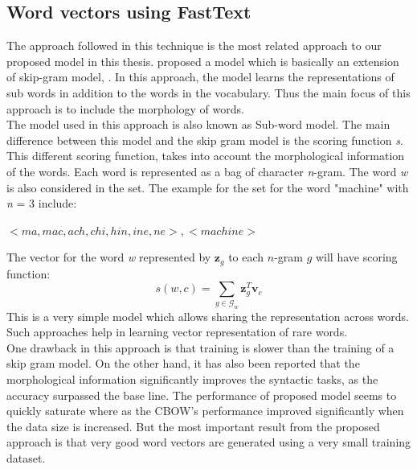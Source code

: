 \subsection{Word vectors using FastText}
The approach followed in this technique is the most related approach to our proposed model in this thesis. \cite{bojanowski2016enriching} proposed a model which is basically an extension of skip-gram model, \cite{mikolov2013efficient}. In this approach, the model learns the representations of sub words in addition to the words in the vocabulary. Thus the main focus of this approach is to include the morphology of words.\\
The model used in this approach is also known as Sub-word model. The main difference between this model and the skip gram model is the scoring function \textit{s}. This different scoring function, takes into account the morphological information of the words.
Each word is represented as a bag of character \textit{n}-gram. The word \textit{w} is also considered in the set. The example for the set for the word "machine" with \textit{n} = 3 include:
\begin{center}
	$\mathit{<ma, mac, ach, chi, hin, ine, ne>, <machine>}$
\end{center}
The vector for the word \textit{w} represented by $\mathbf{z_{\mathit{g}}}$ to each $\mathit{n}$-gram $\mathit{g}$ will have scoring function:
\begin{equation}
\mathit{s(w,c)} = \sum_{g\in \mathcal{G}_{\mathit{w}}} \mathbf{z}^T_{\mathit{g}}\mathbf{v}_{\mathit{c}}
\end{equation}
This is a very simple model which allows sharing the representation across words. Such approaches help in learning vector representation of rare words.\\
One drawback in this approach is that training is slower than the training of a skip gram model. On the other hand, it has also been reported that the morphological information significantly improves the syntactic tasks, as the accuracy surpassed the base line. The performance of proposed model seems to quickly saturate where as the CBOW's performance improved significantly when the data size is increased. But the most important result from the proposed approach is that very good word vectors are generated using a very small training dataset. 
